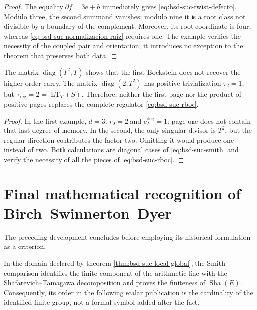 \begin{proof}
The equality \(\partial f=3e+b\) immediately gives
\eqref{eq:bsd-suc-twist-defecto}. Modulo three, the second summand vanishes;
modulo nine it is a root class not divisible by a boundary of the complement.
Moreover, its root coordinate is four, whereas
\eqref{eq:bsd-suc-normalizacion-raiz} requires one. The example verifies the
necessity of the coupled pair and orientation; it introduces no exception
to the theorem that preserves both data.
\end{proof}

\begin{ablation}
\label{abl:bsd-suc-bockstein}
The matrix \(\operatorname{diag}(T^2,T)\) shows that the first Bockstein does not
recover the higher-order carry. The matrix
\(\operatorname{diag}(2,T^2)\) has positive trivialization
\(\tau_2=1\), but
\(\tau_{\mathrm{reg}}=2=\operatorname{LT}_{T}(S)\). Therefore, neither the
first page nor the product of positive pages replaces the complete
regulator \eqref{eq:bsd-suc-rboc}.
\end{ablation}

\begin{proof}
In the first example, \(d=3\), \(r_0=2\) and
\(c_I^{\deg}=1\); page one does not contain that last degree of memory. In
the second, the only singular divisor is \(T^2\), but the regular direction
contributes the factor two. Omitting it would produce one instead of two. Both calculations
are diagonal cases of \eqref{eq:bsd-suc-smith} and verify the necessity of
all the pieces of \eqref{eq:bsd-suc-rboc}.
\end{proof}
\section*{Final mathematical recognition of Birch--Swinnerton--Dyer}

The preceding development concludes before employing its historical formulation
as a criterion.

In the domain declared by theorem
\ref{thm:bsd-suc-local-global}, the Smith comparison identifies the
finite component of the arithmetic line with the
Shafarevich--Tamagawa decomposition and proves the finiteness of
\(\operatorname{Sha}(E)\). Consequently, its order in the following scalar
publication is the cardinality of the identified finite group, not a formal
symbol added after the fact.

